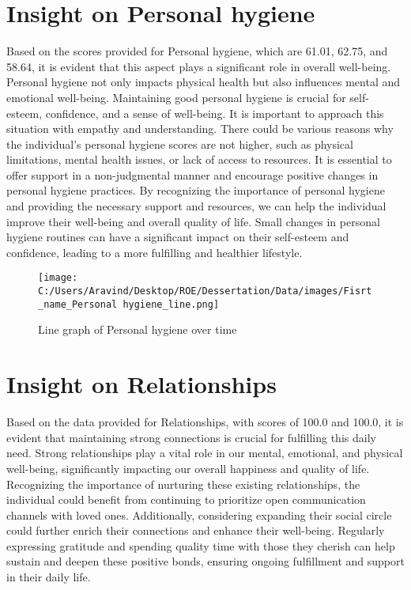 \documentclass[10pt, a4paper]{article}%
\begin{document}
\section{Insight on Personal hygiene}%
\label{sec:InsightonPersonalhygiene}%
Based on the scores provided for Personal hygiene, which are 61.01, 62.75, and 58.64, it is evident that this aspect plays a significant role in overall well{-}being. Personal hygiene not only impacts physical health but also influences mental and emotional well{-}being. Maintaining good personal hygiene is crucial for self{-}esteem, confidence, and a sense of well{-}being.\newline%
\newline%
It is important to approach this situation with empathy and understanding. There could be various reasons why the individual's personal hygiene scores are not higher, such as physical limitations, mental health issues, or lack of access to resources. It is essential to offer support in a non{-}judgmental manner and encourage positive changes in personal hygiene practices.\newline%
\newline%
By recognizing the importance of personal hygiene and providing the necessary support and resources, we can help the individual improve their well{-}being and overall quality of life. Small changes in personal hygiene routines can have a significant impact on their self{-}esteem and confidence, leading to a more fulfilling and healthier lifestyle.%


\begin{figure}[H]%
\centering%
\texttt{[image: C:/Users/Aravind/Desktop/ROE/Dessertation/Data/images/Fisrt\_name\_Personal hygiene\_line.png]}%
\caption{Line graph of Personal hygiene over time}%
\end{figure}

%
\section{Insight on Relationships}%
\label{sec:InsightonRelationships}%
Based on the data provided for Relationships, with scores of 100.0 and 100.0, it is evident that maintaining strong connections is crucial for fulfilling this daily need. Strong relationships play a vital role in our mental, emotional, and physical well{-}being, significantly impacting our overall happiness and quality of life.\newline%
\newline%
Recognizing the importance of nurturing these existing relationships, the individual could benefit from continuing to prioritize open communication channels with loved ones. Additionally, considering expanding their social circle could further enrich their connections and enhance their well{-}being. Regularly expressing gratitude and spending quality time with those they cherish can help sustain and deepen these positive bonds, ensuring ongoing fulfillment and support in their daily life.%
\end{document}
